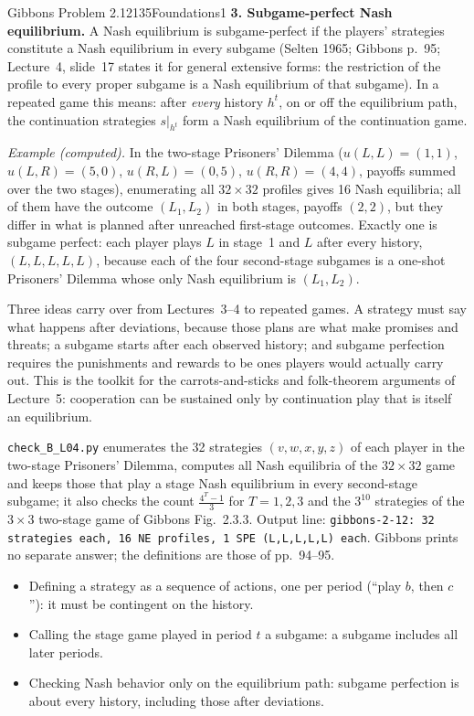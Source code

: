 \begin{exsol}{Gibbons Problem 2.12}{135}{Foundations}{1}
\textbf{3. Subgame-perfect Nash equilibrium.} A Nash equilibrium is subgame-perfect if the players'
strategies constitute a Nash equilibrium in every subgame (Selten 1965; Gibbons p.~95; Lecture~4,
slide~17 states it for general extensive forms: the restriction of the profile to every proper
subgame is a Nash equilibrium of that subgame). In a repeated game this means: after \emph{every}
history $h^t$, on or off the equilibrium path, the continuation strategies $s|_{h^t}$ form a Nash
equilibrium of the continuation game.

\emph{Example (computed).} In the two-stage Prisoners' Dilemma ($u(L,L) = (1,1)$,
$u(L,R) = (5,0)$, $u(R,L) = (0,5)$, $u(R,R) = (4,4)$, payoffs summed over the two stages),
enumerating all $32 \times 32$ profiles gives 16 Nash equilibria; all of them have the outcome
$(L_1,L_2)$ in both stages, payoffs $(2,2)$, but they differ in what is planned after unreached
first-stage outcomes. Exactly one is subgame perfect: each player plays $L$ in stage~1 and $L$ after
every history, $(L,L,L,L,L)$, because each of the four second-stage subgames is a one-shot Prisoners'
Dilemma whose only Nash equilibrium is $(L_1, L_2)$.

\interp Three ideas carry over from Lectures~3--4 to repeated games. A strategy must say what happens
after deviations, because those plans are what make promises and threats; a subgame starts after each
observed history; and subgame perfection requires the punishments and rewards to be ones players would
actually carry out. This is the toolkit for the carrots-and-sticks and folk-theorem arguments of
Lecture~5: cooperation can be sustained only by continuation play that is itself an equilibrium.

\verify \texttt{check\_B\_L04.py} enumerates the 32 strategies $(v,w,x,y,z)$ of each player in the
two-stage Prisoners' Dilemma, computes all Nash equilibria of the $32\times32$ game and keeps those
that play a stage Nash equilibrium in every second-stage subgame; it also checks the count
$\frac{4^T-1}{3}$ for $T = 1, 2, 3$ and the $3^{10}$ strategies of the $3\times3$ two-stage game
of Gibbons Fig.~2.3.3. Output line: \texttt{gibbons-2-12: 32 strategies each, 16 NE profiles, 1 SPE
(L,L,L,L,L) each}. Gibbons prints no separate answer; the definitions are those of pp.~94--95.

\mistakes
\begin{itemize}
  \item Defining a strategy as a sequence of actions, one per period (``play $b$, then $c$''): it must
  be contingent on the history.
  \item Calling the stage game played in period $t$ a subgame: a subgame includes all later periods.
  \item Checking Nash behavior only on the equilibrium path: subgame perfection is about every
  history, including those after deviations.
\end{itemize}


\end{exsol}
